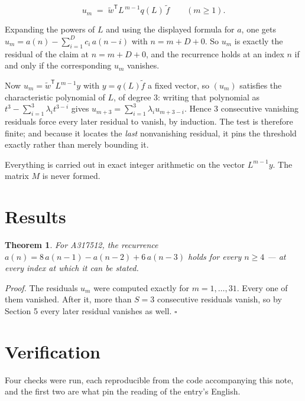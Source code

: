 \documentclass[11pt]{article}
\newtheorem{theorem}{Theorem}
\theoremstyle{definition}
\begin{document}
\[u_m \;=\; \tilde w^{\mathsf T} L^{\,m-1} q(L)\,\tilde f \qquad (m \ge 1).\]

Expanding the powers of $L$ and using the displayed formula for $a$, one gets $u_m = a(n) - \sum_{i=1}^{D} c_i\,a(n-i)$ with $n = m + D + 0$. So $u_m$ is exactly the residual of the claim at $n = m + D + 0$, and the recurrence holds at an index $n$ if and only if the corresponding $u_m$ vanishes.

Now $u_m = \tilde w^{\mathsf T} L^{m-1} y$ with $y = q(L)\tilde f$ a fixed vector, so $(u_m)$ satisfies the characteristic polynomial of $L$, of degree $3$: writing that polynomial as $t^{3} - \sum_{i=1}^{3} \lambda_i t^{3-i}$ gives $u_{m+3} = \sum_{i=1}^{3} \lambda_i u_{m+3-i}$. Hence $3$ consecutive vanishing residuals force every later residual to vanish, by induction. The test is therefore finite; and because it locates the {\itshape last} nonvanishing residual, it pins the threshold exactly rather than merely bounding it.

Everything is carried out in exact integer arithmetic on the vector $L^{m-1}y$. The matrix $M$ is never formed.

\section{Results}

\begin{theorem} For A317512, the recurrence $a(n) = 8\,a(n-1) - a(n-2) + 6\,a(n-3)$ holds for every $n \ge 4$ --- at every index at which it can be stated.\end{theorem}

{\itshape Proof.} The residuals $u_m$ were computed exactly for $m = 1,\dots,31$. Every one of them vanished. After it, more than $S = 3$ consecutive residuals vanish, so by Section 5 every later residual vanishes as well. $\square$

\section{Verification}

Four checks were run, each reproducible from the code accompanying this note, and the first two are what pin the reading of the entry's English.
\end{document}
